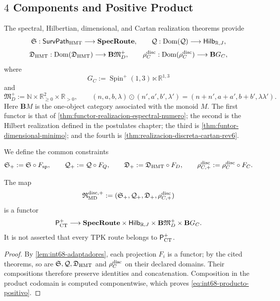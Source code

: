 \subsection{\(4\) Components and Positive Product}

The spectral, Hilbertian, dimensional, and Cartan realization theorems provide
\[
 \mathfrak S:\mathsf{SurvPath}_{\rm HMT}
      \longrightarrow\mathbf{SpecRoute},
 \qquad
 \mathcal Q:\operatorname{Dom}(\mathcal Q)
      \longrightarrow\mathsf{Hilb}_{\mathbb R,J},
\]
\[
 \mathfrak D_{\rm HMT}:\operatorname{Dom}(\mathfrak D_{\rm HMT})
      \longrightarrow\mathbf B\mathfrak M_D^+,
 \qquad
 \rho_C^{\rm disc}:\operatorname{Dom}(\rho_C^{\rm disc})
      \longrightarrow\mathbf B G_C,
\]
where
\[
 G_C:=\operatorname{Spin}^{+}(1,3)\ltimes\mathbb R^{1,3}
\]
and
\begin{equation}
 \mathfrak M_D^+
 :=\mathbb N\times\mathbb R_{\geq0}^{2}\times\mathbb R_{>0},
 \qquad
 (n,a,b,\lambda)\odot(n',a',b',\lambda')
 =(n+n',a+a',b+b',\lambda\lambda').
 \label{eq:int68-monoide-dimensional-positivo}
\end{equation}
Here \(\mathbf BM\) is the one-object category associated with the monoid
\(M\). The first functor is that of
\cref{thm:functor-realizacion-espectral-numero}; the second is the
Hilbert realization defined in the postulates chapter; the third is
\cref{thm:funtor-dimensional-minimo}; and the fourth is
\cref{thm:realizacion-discreta-cartan-rev6}.

We define the common constraints
\[
 \mathfrak S_+:=\mathfrak S\circ F_{\rm sp},\qquad
 \mathcal Q_+:=\mathcal Q\circ F_Q,\qquad
 \mathfrak D_+:=\mathfrak D_{\rm HMT}\circ F_D,\qquad
 \rho_{C,+}^{\rm disc}:=\rho_C^{\rm disc}\circ F_C.
\]

\begin{theorem}
\label{thm:int68-producto-positivo}
The map
\begin{equation}
 \mathfrak R_{\rm MD}^{\rm disc,+}
 :=(\mathfrak S_+,\mathcal Q_+,\mathfrak D_+,
       \rho_{C,+}^{\rm disc})
 \label{eq:int68-producto-positivo}
\end{equation}
is a functor
\[
 \mathsf P_{\rm CT}^{+}\longrightarrow
 \mathbf{SpecRoute}\times\mathsf{Hilb}_{\mathbb R,J}
 \times\mathbf B\mathfrak M_D^+\times\mathbf BG_C.
\]
It is not asserted that every TPK route belongs to \(\mathsf P_{\rm CT}^{+}\).
\end{theorem}

\begin{proof}
By \cref{lem:int68-adaptadores}, each projection \(F_i\) is a functor;
by the cited theorems, so are
\(\mathfrak S,\mathcal Q,\mathfrak D_{\rm HMT}\) and
\(\rho_C^{\rm disc}\) on their declared domains. Their compositions
therefore preserve identities and concatenation. Composition in the product
codomain is computed componentwise, which proves
\eqref{eq:int68-producto-positivo}.
\end{proof}

